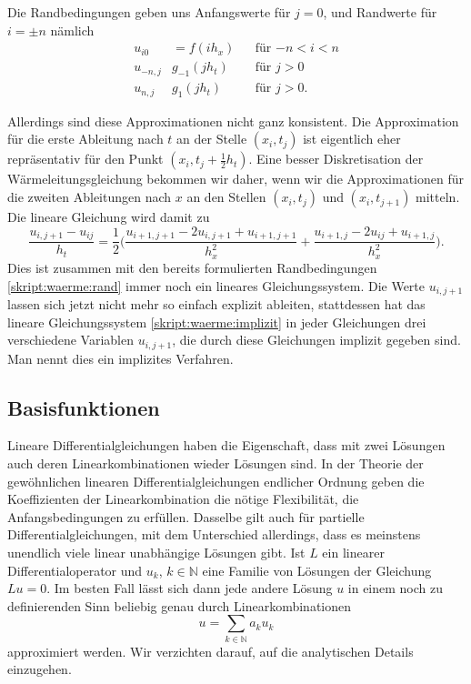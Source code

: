 Die Randbedingungen geben uns Anfangswerte für $j=0$, und Randwerte
für $i=\pm n$ nämlich
\begin{equation}
\begin{aligned}
u_{i0} &= f(ih_x)&&\text{für $-n<i<n$}\\
u_{-n,j} & g_{-1}(jh_t)&&\text{für $j>0$}\\
u_{n,j} & g_{1}(jh_t)&&\text{für $j>0$.}
\end{aligned}
\label{skript:waerme:rand}
\end{equation}

Allerdings sind diese Approximationen nicht ganz konsistent.
Die Approximation für die erste Ableitung nach $t$ an der Stelle
$(x_i,t_j)$ ist eigentlich eher repräsentativ für den Punkt
$(x_i,t_j+\frac12h_t)$.
Eine besser Diskretisation der Wärmeleitungsgleichung bekommen wir daher,
wenn wir die Approximationen für die zweiten Ableitungen nach $x$ an
den Stellen $(x_i,t_j)$  und $(x_i,t_{j+1})$ mitteln. 
Die lineare Gleichung wird damit zu
\begin{equation}
\frac{u_{i,j+1}-u_{ij}}{h_t}
=
\frac12\biggl(
\frac{u_{i+1,j+1}-2u_{i,j+1}+u_{i+1,j+1}}{h_x^2}
+
\frac{u_{i+1,j}-2u_{ij}+u_{i+1,j}}{h_x^2}
\biggr).
\label{skript:waerme:implizit}
\end{equation}
Dies ist zusammen mit den bereits formulierten Randbedingungen
\eqref{skript:waerme:rand}
immer noch ein lineares Gleichungssystem.
Die Werte $u_{i,j+1}$ lassen sich jetzt nicht mehr so einfach
explizit ableiten, stattdessen hat das lineare Gleichungssystem
\eqref{skript:waerme:implizit}
in jeder Gleichungen drei verschiedene Variablen $u_{i,j+1}$,
die durch diese Gleichungen implizit gegeben sind.
Man nennt dies ein implizites Verfahren.

\subsection{Basisfunktionen}
Lineare Differentialgleichungen haben die Eigenschaft, dass 
mit zwei Lösungen auch deren Linearkombinationen wieder Lösungen sind.
In der Theorie der gewöhnlichen linearen Differentialgleichungen endlicher
Ordnung geben die Koeffizienten der Linearkombination die nötige Flexibilität,
die Anfangsbedingungen zu erfüllen.
Dasselbe gilt auch für partielle Differentialgleichungen, mit dem Unterschied
allerdings, dass es meinstens unendlich viele linear unabhängige Lösungen
gibt.
Ist $L$ ein linearer Differentialoperator und $u_k$, $k\in\mathbb N$ eine
Familie von Lösungen der Gleichung $Lu=0$.
Im besten Fall lässt sich dann jede andere Lösung $u$ in einem noch
zu definierenden Sinn beliebig genau durch Linearkombinationen
\[
u=\sum_{k\in\mathbb N} a_ku_k
\]
approximiert werden.
Wir verzichten darauf, auf die analytischen Details einzugehen.

